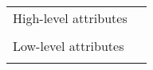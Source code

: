 \begin{center}
  \begin{tabular}{ |L{4cm}|L{10cm}|  }
    \hline
    High-level attributes & \\
    & \\
    \hline
    Low-level attributes & \\
    & \\
    \hline
  \end{tabular}
\end{center}
